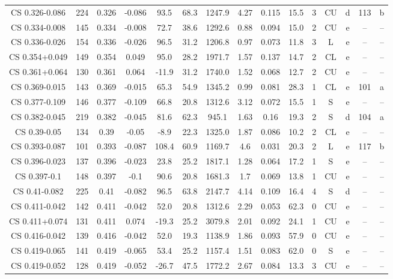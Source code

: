 \begin{table}
\begin{tabular}{ccccccccccccccc}
CS 0.326-0.086 & 224 & 0.326 & -0.086 & 93.5 & 68.3 & 1247.9 & 4.27 & 0.115 & 15.5 & 3 & CU & d & 113 & b \\
CS 0.334-0.008 & 145 & 0.334 & -0.008 & 72.7 & 38.6 & 1292.6 & 0.88 & 0.094 & 15.0 & 2 & CU & e & -- & -- \\
CS 0.336-0.026 & 154 & 0.336 & -0.026 & 96.5 & 31.2 & 1206.8 & 0.97 & 0.073 & 11.8 & 3 & L & e & -- & -- \\
CS 0.354+0.049 & 149 & 0.354 & 0.049 & 95.0 & 28.2 & 1971.7 & 1.57 & 0.137 & 14.7 & 2 & CL & e & -- & -- \\
CS 0.361+0.064 & 130 & 0.361 & 0.064 & -11.9 & 31.2 & 1740.0 & 1.52 & 0.068 & 12.7 & 2 & CU & e & -- & -- \\
CS 0.369-0.015 & 143 & 0.369 & -0.015 & 65.3 & 54.9 & 1345.2 & 0.99 & 0.081 & 28.3 & 1 & CL & e & 101 & a \\
CS 0.377-0.109 & 146 & 0.377 & -0.109 & 66.8 & 20.8 & 1312.6 & 3.12 & 0.072 & 15.5 & 1 & S & e & -- & -- \\
CS 0.382-0.045 & 219 & 0.382 & -0.045 & 81.6 & 62.3 & 945.1 & 1.63 & 0.16 & 19.3 & 2 & S & d & 104 & a \\
CS 0.39-0.05 & 134 & 0.39 & -0.05 & -8.9 & 22.3 & 1325.0 & 1.87 & 0.086 & 10.2 & 2 & CL & e & -- & -- \\
CS 0.393-0.087 & 101 & 0.393 & -0.087 & 108.4 & 60.9 & 1169.7 & 4.6 & 0.031 & 20.3 & 2 & L & e & 117 & b \\
CS 0.396-0.023 & 137 & 0.396 & -0.023 & 23.8 & 25.2 & 1817.1 & 1.28 & 0.064 & 17.2 & 1 & S & e & -- & -- \\
CS 0.397-0.1 & 148 & 0.397 & -0.1 & 90.6 & 20.8 & 1681.3 & 1.7 & 0.069 & 13.8 & 1 & CU & e & -- & -- \\
CS 0.41-0.082 & 225 & 0.41 & -0.082 & 96.5 & 63.8 & 2147.7 & 4.14 & 0.109 & 16.4 & 4 & S & d & -- & -- \\
CS 0.411-0.042 & 142 & 0.411 & -0.042 & 52.0 & 20.8 & 1312.6 & 2.29 & 0.053 & 62.3 & 0 & CU & e & -- & -- \\
CS 0.411+0.074 & 131 & 0.411 & 0.074 & -19.3 & 25.2 & 3079.8 & 2.01 & 0.092 & 24.1 & 1 & CU & e & -- & -- \\
CS 0.416-0.042 & 139 & 0.416 & -0.042 & 52.0 & 19.3 & 1138.9 & 1.86 & 0.093 & 57.9 & 0 & CU & e & -- & -- \\
CS 0.419-0.065 & 141 & 0.419 & -0.065 & 53.4 & 25.2 & 1157.4 & 1.51 & 0.083 & 62.0 & 0 & S & e & -- & -- \\
CS 0.419-0.052 & 128 & 0.419 & -0.052 & -26.7 & 47.5 & 1772.2 & 2.67 & 0.084 & 13.3 & 3 & CU & e & -- & -- \\

\end{tabular}
\end{table}
